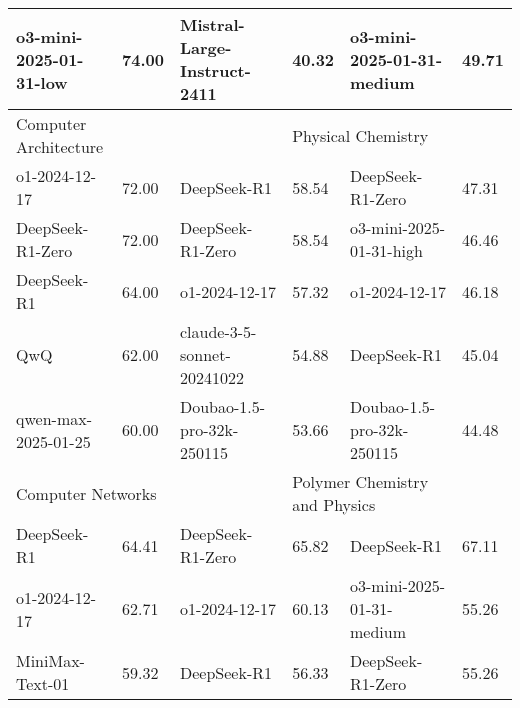 {\begin{longtable}{p{4.2cm}>{\centering\arraybackslash} p{0.8cm}|p{4.2cm} >{\centering\arraybackslash} p{0.8cm}|p{4.2cm} >{\centering\arraybackslash} p{0.8cm}}
\cellcolor{blue!5} o3-mini-2025-01-31-low & \cellcolor{blue!2}74.00 & \cellcolor{purple!5} Mistral-Large-Instruct-2411 & \cellcolor{purple!2} 40.32 & \cellcolor{green!5} o3-mini-2025-01-31-medium & \cellcolor{green!2} 49.71\\
\hline
\multicolumn{2}{p{5.15cm}|}{\cellcolor{blue!10} \centering Computer Architecture} & \multicolumn{2}{p{5.15cm}|}{\cellcolor{purple!10} \centering Drama and Opera Studies} & \multicolumn{2}{p{5.15cm}}{\cellcolor{green!10} \centering Physical Chemistry}\\
\hline
\cellcolor{blue!5} o1-2024-12-17 & \cellcolor{blue!2}72.00 & \cellcolor{purple!5} DeepSeek-R1 & \cellcolor{purple!2} 58.54 & \cellcolor{green!5} DeepSeek-R1-Zero & \cellcolor{green!2} 47.31\\
\cellcolor{blue!5} DeepSeek-R1-Zero & \cellcolor{blue!2}72.00 & \cellcolor{purple!5} DeepSeek-R1-Zero & \cellcolor{purple!2} 58.54 & \cellcolor{green!5} o3-mini-2025-01-31-high & \cellcolor{green!2} 46.46\\
\cellcolor{blue!5} DeepSeek-R1 & \cellcolor{blue!2}64.00 & \cellcolor{purple!5} o1-2024-12-17 & \cellcolor{purple!2} 57.32 & \cellcolor{green!5} o1-2024-12-17 & \cellcolor{green!2} 46.18\\
\cellcolor{blue!5} QwQ & \cellcolor{blue!2}62.00 & \cellcolor{purple!5} claude-3-5-sonnet-20241022 & \cellcolor{purple!2} 54.88 & \cellcolor{green!5} DeepSeek-R1 & \cellcolor{green!2} 45.04\\
\cellcolor{blue!5} qwen-max-2025-01-25 & \cellcolor{blue!2}60.00 & \cellcolor{purple!5} Doubao-1.5-pro-32k-250115 & \cellcolor{purple!2} 53.66 & \cellcolor{green!5} Doubao-1.5-pro-32k-250115 & \cellcolor{green!2} 44.48\\
\hline
\multicolumn{2}{p{5.15cm}|}{\cellcolor{blue!10} \centering Computer Networks} & \multicolumn{2}{p{5.15cm}|}{\cellcolor{purple!10} \centering Film Studies} & \multicolumn{2}{p{5.15cm}}{\cellcolor{green!10} \centering Polymer Chemistry and Physics}\\
\hline
\cellcolor{blue!5} DeepSeek-R1 & \cellcolor{blue!2}64.41 & \cellcolor{purple!5} DeepSeek-R1-Zero & \cellcolor{purple!2} 65.82 & \cellcolor{green!5} DeepSeek-R1 & \cellcolor{green!2} 67.11\\
\cellcolor{blue!5} o1-2024-12-17 & \cellcolor{blue!2}62.71 & \cellcolor{purple!5} o1-2024-12-17 & \cellcolor{purple!2} 60.13 & \cellcolor{green!5} o3-mini-2025-01-31-medium & \cellcolor{green!2} 55.26\\
\cellcolor{blue!5} MiniMax-Text-01 & \cellcolor{blue!2}59.32 & \cellcolor{purple!5} DeepSeek-R1 & \cellcolor{purple!2} 56.33 & \cellcolor{green!5} DeepSeek-R1-Zero & \cellcolor{green!2} 55.26\\

\end{longtable}}
